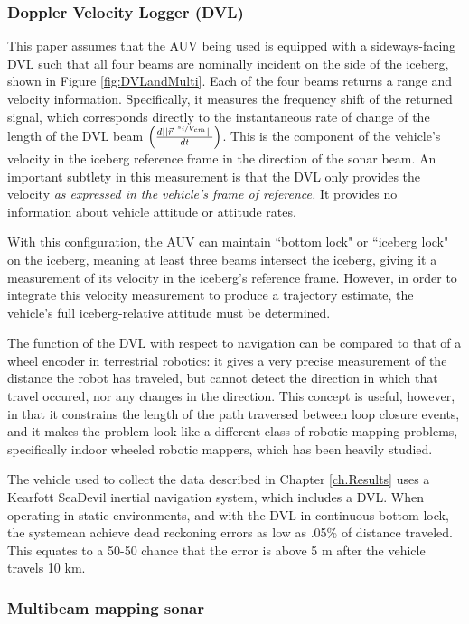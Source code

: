 \subsubsection{Doppler Velocity Logger (DVL)}

This paper assumes that the AUV being used is equipped with a sideways-facing DVL such that all four beams are nominally incident on the side of the iceberg, shown in Figure \ref{fig:DVLandMulti}. Each of the four beams returns a range and velocity information. Specifically, it measures the frequency shift of the returned signal, which corresponds directly to the instantaneous rate of change of the length of the DVL beam $\left( \frac{d||\vec{r}^{~\nicefrac{s_i}{V_{cm}}}||}{dt}\right)$. This is the component of the vehicle's velocity in the iceberg reference frame in the direction of the sonar beam. An important subtlety in this measurement is that the DVL only provides the velocity \emph{as expressed in the vehicle's frame of reference.} It provides no information about vehicle attitude or attitude rates. 

With this configuration, the AUV can maintain ``bottom lock" or ``iceberg lock" on the iceberg, meaning at least three beams intersect the iceberg, giving it a measurement of its velocity in the iceberg's reference frame. However, in order to integrate this velocity measurement to produce a trajectory estimate, the vehicle's full iceberg-relative attitude must be determined.

The function of the DVL with respect to navigation can be compared to that of a wheel encoder in terrestrial robotics: it gives a very precise measurement of the distance the robot has traveled, but cannot detect the direction in which that travel occured, nor any changes in the direction. This concept is useful, however, in that it constrains the length of the path traversed between loop closure events, and it makes the problem look like a different class of robotic mapping problems, specifically indoor wheeled robotic mappers, which has been heavily studied. 

The vehicle used to collect the data described in Chapter \ref{ch.Results} uses a Kearfott SeaDevil inertial navigation system, which includes a DVL. When operating in static environments, and with the DVL in continuous bottom lock, the systemcan achieve dead reckoning errors as low as .05\% of distance traveled. This equates to a 50-50 chance that the error is above 5 m after the vehicle travels 10 km. 

\subsubsection{Multibeam mapping sonar}

